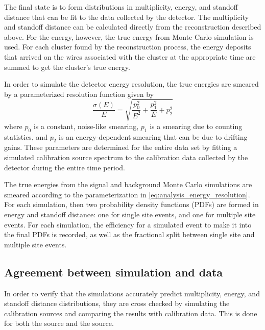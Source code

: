 \documentclass[herrin-thesis.tex]{subfiles}
\begin{document}
The final state is to form distributions in multiplicity, energy, and standoff distance that can be fit to the data collected by the detector. The multiplicity and standoff distance can be calculated directly from the reconstruction described above. For the energy, however, the true energy from Monte Carlo simulation is used. For each cluster found by the reconstruction process, the energy deposits that arrived on the wires associated with the cluster at the appropriate time are summed to get the cluster's true energy.

In order to simulate the detector energy resolution, the true energies are smeared by a parameterized resolution function given by
\begin{equation}
\frac{\sigma(E)}{E} = \sqrt{\frac{p_0^2}{E^2} + \frac{p_1^2}{E} + p_2^2}
\label{eq:analysis_energy_resolution}
\end{equation}
where \(p_0\) is a constant, noise-like smearing, \(p_1\) is a smearing due to counting statistics, and \(p_2\) is an energy-dependent smearing that can be due to drifting gains. These parameters are determined for the entire data set by fitting a simulated calibration source spectrum to the calibration data collected by the detector during the entire time period.

The true energies from the signal and background Monte Carlo simulations are smeared according to the parameterization in \cref{eq:analysis_energy_resolution}. For each simulation, then two probability density functions (PDFs) are formed in energy and standoff distance: one for single site events, and one for multiple site events. For each simulation, the efficiency for a simulated event to make it into the final PDFs is recorded, as well as the fractional split between single site and multiple site events.

\subsection{Agreement between simulation and data}
In order to verify that the simulations accurately predict multiplicity, energy, and standoff distance distributions, they are cross checked by simulating the calibration sources and comparing the results with calibration data. This is done for both the  source and the  source.
\end{document}
